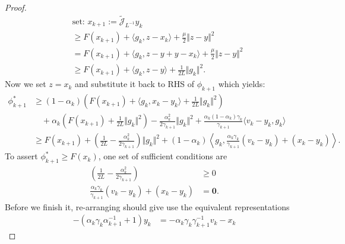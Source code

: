 \documentclass[12pt]{article}
\begin{document}
\begin{proof}
\begin{align*}
            & \text{set: }x_{k + 1} := \widetilde{\mathcal J}_{L^{-1}}y_k
            \\
            &\ge 
            F(x_{k + 1}) + \langle g_k, z - x_k\rangle + \frac{\mu}{2}\Vert z - y\Vert^2
            \\
            &=
            F(x_{k + 1}) + \langle g_k, z - y + y - x_k\rangle + \frac{\mu}{2}\Vert z - y\Vert^2
            \\
            &\ge
            F(x_{k + 1}) + \langle g_k, z - y\rangle 
            + \frac{1}{2L}\Vert g_k\Vert^2. 
        \end{align*}
        Now we set $z = x_{k}$ and substitute it back to RHS of $\phi_{k + 1}$ which yields: 
        \begin{align*}
            \phi_{k + 1}^*
            &\ge 
            (1 - \alpha_k)
            \left(
                F(x_{k + 1}) + \langle g_k, x_k - y_k\rangle + \frac{1}{2L}\Vert g_k\Vert^2
            \right)
            \\
            &\quad 
            + 
            \alpha_k
            \left(
                F(x_{k + 1}) + \frac{1}{2L}\Vert g_k\Vert^2
            \right)
            - \frac{\alpha_k^2}{2\gamma_{k + 1}}\Vert g_k\Vert^2
            + 
            \frac{\alpha_k (1 - \alpha_k)\gamma_k}{\gamma_{k + 1}}
            \langle v_k - y_k, g_k\rangle
            \\
            &\ge 
            F(x_{k + 1})
            + 
            \left(
                \frac{1}{2L} - \frac{\alpha_k^2}{2\gamma_{k + 1}}
            \right)\Vert g_k\Vert^2
            + 
            (1 - \alpha_k)
            \left\langle 
                g_k, \frac{\alpha_k\gamma_k}{\gamma_{k + 1}}(v_k - y_k) + (x_k - y_k)
            \right\rangle. 
        \end{align*}
        To assert $\phi_{k + 1}^* \ge F(x_k)$, one set of sufficient conditions are 
        \begin{align*}
            \left(
                \frac{1}{2L} - \frac{\alpha_k^2}{2\gamma_{k + 1}}
            \right) &\ge 0
            \\
            \frac{\alpha_k\gamma_k}{\gamma_{k + 1}}(v_k - y_k) + (x_k - y_k) 
            &= \mathbf 0. 
        \end{align*}
        Before we finish it, re-arranging should give use the equivalent representations 
        \begin{align*}
            -(\alpha_k \gamma_k\alpha_{k + 1}^{-1} + 1)y_k
            &= 
            - \alpha_k \gamma_k \gamma_{k + 1}^{-1}v_k - x_k

\end{align*}
\end{proof}
\end{document}

